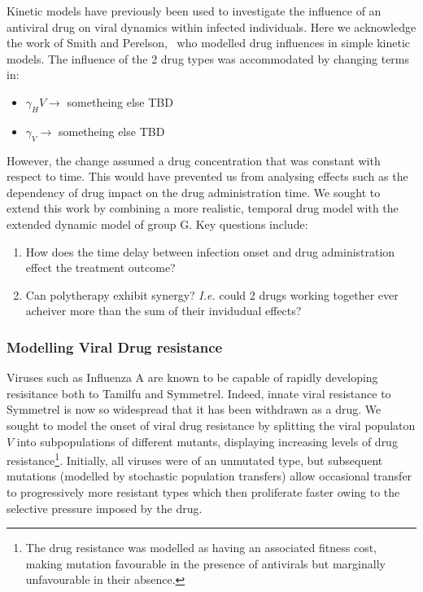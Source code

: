 \documentclass[a4paper, 12pt]{report}
\begin{document}
Kinetic models have previously been used to investigate the influence of an antiviral drug on viral dynamics within infected individuals. Here we acknowledge the work of Smith and Perelson,~\cite{Smith} who modelled drug influences in simple kinetic models.
The influence of the 2 drug types was accommodated by changing terms in:
\begin{itemize}
\item  $\gamma_HV \rightarrow $ sometheing else TBD
\item $\gamma_V \rightarrow $ sometheing else TBD
\end{itemize}
However, the change assumed a drug concentration that was constant with respect to time. This would have prevented us from analysing effects such as the dependency of drug impact on the drug administration time.
We sought to extend this work by combining a more realistic, temporal drug model with the extended dynamic model of group G. 
Key questions include:
\begin{enumerate}
\item How does the time delay between infection onset and drug administration effect the treatment outcome?
\item Can polytherapy exhibit synergy? \textit{I.e.} could 2 drugs working together ever acheiver more than the sum of their invidudual effects?
\end{enumerate}

\subsubsection{Modelling Viral Drug resistance}

Viruses such as Influenza A are known to be capable of rapidly developing resisitance both to Tamilfu and Symmetrel.
Indeed, innate viral resistance to Symmetrel is now so widespread that it has been withdrawn as a drug.
We sought to model the onset of viral drug resistance by splitting the viral populaton $V$ into subpopulations of different mutants, displaying increasing levels of drug resistance\footnote{The drug resistance was modelled as having an associated fitness cost, making mutation favourable in the presence of antivirals but marginally unfavourable in their absence.}. Initially, all viruses were of an unmutated type, but subsequent mutations (modelled by stochastic population transfers) allow occasional transfer to progressively more resistant types which then proliferate faster owing to the selective pressure imposed by the drug.
\end{document}
